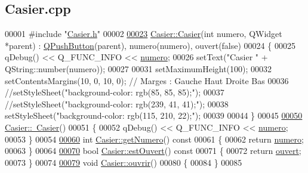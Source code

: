 \hypertarget{_casier_8cpp_source}{}\subsection{Casier.\+cpp}
\label{_casier_8cpp_source}

\begin{DoxyCode}
00001 \textcolor{preprocessor}{#include "\hyperlink{_casier_8h}{Casier.h}"}
00002 
\hyperlink{class_casier_aed1cd4435ff913a68b69d8119481bb8f}{00023} \hyperlink{class_casier_aed1cd4435ff913a68b69d8119481bb8f}{Casier::Casier}(\textcolor{keywordtype}{int} numero, QWidget *parent) : \hyperlink{class_q_push_button}{QPushButton}(parent), numero(numero),
       ouvert(false)
00024 \{
00025     qDebug() << Q\_FUNC\_INFO << \hyperlink{class_casier_a17aa23e73b177559266a9fb17f63b812}{numero};
00026     setText(\textcolor{stringliteral}{"Casier "} + QString::number(numero));
00027 
00031     setMaximumHeight(100);
00032     setContentsMargins(10, 0, 10, 0); \textcolor{comment}{// Marges : Gauche Haut Droite Bas}
00036 \textcolor{comment}{}    \textcolor{comment}{//setStyleSheet("background-color: rgb(85, 85, 85);");}
00037     \textcolor{comment}{//setStyleSheet("background-color: rgb(239, 41, 41);");}
00038     setStyleSheet(\textcolor{stringliteral}{"background-color: rgb(115, 210, 22);"});
00039 
00044 \}
00045 
\hyperlink{class_casier_a4aebc2219ccd4612cf79413904bb9340}{00050} \hyperlink{class_casier_a4aebc2219ccd4612cf79413904bb9340}{Casier::~Casier}()
00051 \{
00052     qDebug() << Q\_FUNC\_INFO << \hyperlink{class_casier_a17aa23e73b177559266a9fb17f63b812}{numero};
00053 \}
00054 
\hyperlink{class_casier_a061b024a2733a5bb1dfcc43bb0022707}{00060} \textcolor{keywordtype}{int} \hyperlink{class_casier_a061b024a2733a5bb1dfcc43bb0022707}{Casier::getNumero}()\textcolor{keyword}{ const}
00061 \textcolor{keyword}{}\{
00062     \textcolor{keywordflow}{return} \hyperlink{class_casier_a17aa23e73b177559266a9fb17f63b812}{numero};
00063 \}
00064 
\hyperlink{class_casier_ab26fd4da845423355835da8d445ed5dd}{00070} \textcolor{keywordtype}{bool} \hyperlink{class_casier_ab26fd4da845423355835da8d445ed5dd}{Casier::estOuvert}()\textcolor{keyword}{ const}
00071 \textcolor{keyword}{}\{
00072     \textcolor{keywordflow}{return} \hyperlink{class_casier_afe544ed1a87ce714a9fbbe16126669e4}{ouvert};
00073 \}
00074 
\hyperlink{class_casier_ac4b0de3ba58dc2bab52b049b278f4f90}{00079} \textcolor{keywordtype}{void} \hyperlink{class_casier_ac4b0de3ba58dc2bab52b049b278f4f90}{Casier::ouvrir}()
00080 \{
00084 \}
00085 
\end{DoxyCode}
